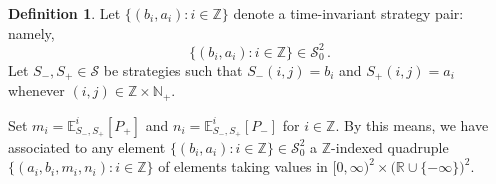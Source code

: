 \documentclass[letterpaper,11pt,oneside,reqno]{amsbook}
\newcommand{\N}{\ensuremath{\mathbb{N}}}
\newcommand{\R}{\ensuremath{\mathbb{R}}}
\newcommand{\Z}{\ensuremath{\mathbb{Z}}}
\newcommand{\E}[0]{\mathbb{E}}
\numberwithin{figure}{chapter}
\theoremstyle{definition}
\theoremstyle{definition}
\theoremstyle{definition}
\newtheorem{definition}[theorem]{Definition}
\theoremstyle{definition}
\theoremstyle{definition}
\newcommand{\mc}{\mathcal}
\newcommand{\nwithoutzero}{\N_+}
\newcommand{\tis}{\mc{S}_0}
\newcommand\egameplay[3]{\E^{#3}_{#1,#2}}
\def\hfff#1{\label{#1}}
\begin{document}
 \begin{definition}\label{d.quadruple}
 Let $\big\{ (b_i,a_i): i \in \Z \big\}$ denote\hfff{aiai} a time-invariant strategy pair: namely,  
 $$
 \big\{ (b_i,a_i): i \in \Z \big\}  \in \tis^2 \, .
 $$
Let $S_-,S_+ \in \mc{S}$ be strategies such that $S_-(i,j) = b_i$ and $S_+(i,j) = a_i$  whenever $(i,j) \in \Z \times \nwithoutzero$. 
 
 Set $m_i = \egameplay{S_-}{S_+}{i} [ P_+]$ and  $n_i = \egameplay{S_-}{S_+}{i}  [P_-]$ for $i \in \Z$. By this means,\hfff{mini}
 we have associated to any element  $\big\{ (b_i,a_i): i \in \Z \big\}  \in \tis^2$
 a $\Z$-indexed quadruple  $\big\{ (a_i,b_i,m_i,n_i): i \in \Z \big\}$ of elements taking values in $[0,\infty)^2 \times \big(\R  \cup \{ -\infty\}\big)^2$.
 \end{definition}
 
\end{document}
